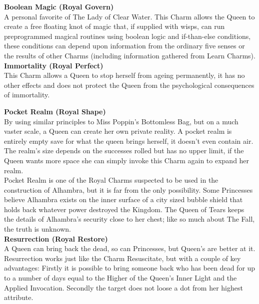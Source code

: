 \textbf{Boolean Magic (Royal Govern)}\\

\noindent A personal favorite of The Lady of Clear Water. This Charm allows the Queen to create a free floating knot of magic that, if supplied with wisps, can run preprogrammed magical routines using boolean logic and if-than-else conditions, these conditions can depend upon information from the ordinary five senses or the results of other Charms (including information gathered from Learn Charms).\\

\noindent \textbf{Immortality (Royal Perfect)}\\

\noindent This Charm allows a Queen to stop herself from ageing permanently, it has no other effects and does not protect the Queen from the psychological consequences of immortality.

\noindent \textbf{Pocket Realm (Royal Shape)}\\

\noindent By using similar principles to Miss Poppin's Bottomless Bag, but on a much vaster scale, a Queen can create her own private reality. A pocket realm is entirely empty save for what the queen brings herself, it doesn’t even contain air. The realm's size depends on the successes rolled but has no upper limit, if the Queen wants more space she can simply invoke this Charm again to expand her realm.\\

Pocket Realm is one of the Royal Charms suspected to be used in the construction of Alhambra, but it is far from the only possibility. Some Princesses believe Alhambra exists on the inner surface of a city sized bubble shield that holds back whatever power destroyed the Kingdom. The Queen of Tears keeps the details of Alhambra's security close to her chest; like so much about The Fall, the truth is unknown.\\

\noindent \textbf{Resurrection (Royal Restore)}\\

\noindent A Queen can bring back the dead, so can Princesses, but Queen's are better at it. Resurrection works just like the Charm Resuscitate, but with a couple of key advantages: Firstly it is possible to bring someone back who has been dead for up to a number of days equal to the Higher of the Queen's Inner Light and the Applied Invocation. Secondly the target does not loose a dot from her highest attribute. 

